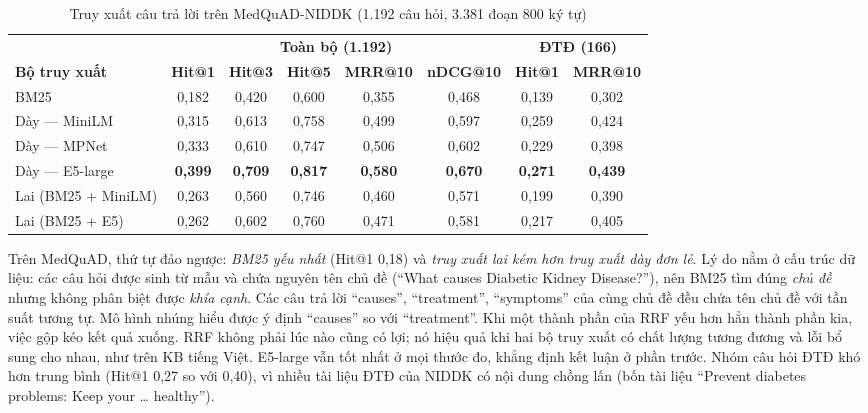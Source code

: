 \begin{table}[H]
\centering
\caption{Truy xuất câu trả lời trên MedQuAD-NIDDK (1.192 câu hỏi, 3.381 đoạn 800 ký tự)}
\label{tab:ch5-mq}
\small
\begin{adjustbox}{max width=\linewidth}
\begin{tabular}{@{}lccccc|cc@{}}
\toprule
 & \multicolumn{5}{c|}{\textbf{Toàn bộ (1.192)}} & \multicolumn{2}{c}{\textbf{ĐTĐ (166)}} \\
\textbf{Bộ truy xuất} & \textbf{Hit@1} & \textbf{Hit@3} & \textbf{Hit@5} & \textbf{MRR@10} & \textbf{nDCG@10} & \textbf{Hit@1} & \textbf{MRR@10} \\
\midrule
BM25 & 0,182 & 0,420 & 0,600 & 0,355 & 0,468 & 0,139 & 0,302 \\
Dày — MiniLM & 0,315 & 0,613 & 0,758 & 0,499 & 0,597 & 0,259 & 0,424 \\
Dày — MPNet & 0,333 & 0,610 & 0,747 & 0,506 & 0,602 & 0,229 & 0,398 \\
Dày — E5-large & \textbf{0,399} & \textbf{0,709} & \textbf{0,817} & \textbf{0,580} & \textbf{0,670} & \textbf{0,271} & \textbf{0,439} \\
Lai (BM25 + MiniLM) & 0,263 & 0,560 & 0,746 & 0,460 & 0,571 & 0,199 & 0,390 \\
Lai (BM25 + E5) & 0,262 & 0,602 & 0,760 & 0,471 & 0,581 & 0,217 & 0,405 \\
\bottomrule
\end{tabular}
\end{adjustbox}
\end{table}

Trên MedQuAD, thứ tự đảo ngược: \emph{BM25 yếu nhất} (Hit@1 0,18) và \emph{truy xuất lai kém hơn truy xuất dày đơn lẻ}. Lý do nằm ở cấu trúc dữ liệu: các câu hỏi được sinh từ mẫu và chứa nguyên tên chủ đề (``What causes Diabetic Kidney Disease?''), nên BM25 tìm đúng \emph{chủ đề} nhưng không phân biệt được \emph{khía cạnh}. Các câu trả lời ``causes'', ``treatment'', ``symptoms'' của cùng chủ đề đều chứa tên chủ đề với tần suất tương tự. Mô hình nhúng hiểu được ý định ``causes'' so với ``treatment''. Khi một thành phần của RRF yếu hơn hẳn thành phần kia, việc gộp kéo kết quả xuống. RRF không phải lúc nào cũng có lợi; nó hiệu quả khi hai bộ truy xuất có chất lượng tương đương và lỗi bổ sung cho nhau, như trên KB tiếng Việt. E5-large vẫn tốt nhất ở mọi thước đo, khẳng định kết luận ở phần trước. Nhóm câu hỏi ĐTĐ khó hơn trung bình (Hit@1 0,27 so với 0,40), vì nhiều tài liệu ĐTĐ của NIDDK có nội dung chồng lấn (bốn tài liệu ``Prevent diabetes problems: Keep your \ldots{} healthy'').

